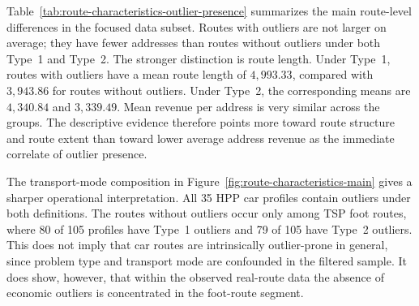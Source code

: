 \documentclass[preprint,12pt]{elsarticle}
\begin{document}
Table~\ref{tab:route-characteristics-outlier-presence} summarizes the main route-level differences in the focused data subset. Routes with outliers are not larger on average; they have fewer addresses than routes without outliers under both Type~1 and Type~2. The stronger distinction is route length. Under Type~1, routes with outliers have a mean route length of $4{,}993.33$, compared with $3{,}943.86$ for routes without outliers. Under Type~2, the corresponding means are $4{,}340.84$ and $3{,}339.49$. Mean revenue per address is very similar across the groups. The descriptive evidence therefore points more toward route structure and route extent than toward lower average address revenue as the immediate correlate of outlier presence.

\begin{table}[htbp]
\centering
\caption{Route characteristics with and without economic outliers.}
\label{tab:route-characteristics-outlier-presence}
\end{table}

The transport-mode composition in Figure~\ref{fig:route-characteristics-main} gives a sharper operational interpretation. All 35 HPP car profiles contain outliers under both definitions. The routes without outliers occur only among TSP foot routes, where 80 of 105 profiles have Type~1 outliers and 79 of 105 have Type~2 outliers. This does not imply that car routes are intrinsically outlier-prone in general, since problem type and transport mode are confounded in the filtered sample. It does show, however, that within the observed real-route data the absence of economic outliers is concentrated in the foot-route segment.
\end{document}
